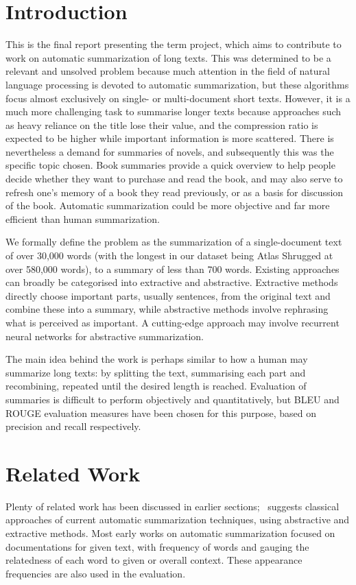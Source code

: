 \section{Introduction}
This is the final report presenting the term project, which aims to contribute to work on automatic summarization of long texts. This was determined to be a relevant and unsolved problem because much attention in the field of natural language processing is devoted to automatic summarization, but these algorithms focus almost exclusively on single- or multi-document short texts. However, it is a much more challenging task to summarise longer texts because approaches such as heavy reliance on the title lose their value, and the compression ratio is expected to be higher while important information is more scattered. There is nevertheless a demand for summaries of novels, and subsequently this was the specific topic chosen. Book summaries provide a quick overview to help people decide whether they want to purchase and read the book, and may also serve to refresh one's memory of a book they read previously, or as a basis for discussion of the book. Automatic summarization could be more objective and far more efficient than human summarization.

We formally define the problem as the summarization of a single-document text of over 30,000 words (with the longest in our dataset being Atlas Shrugged at over 580,000 words), to a summary of less than 700 words. Existing approaches can broadly be categorised into extractive and abstractive. Extractive methods directly choose important parts, usually sentences, from the original text and combine these into a summary, while abstractive methods involve rephrasing what is perceived as important. A cutting-edge approach may involve recurrent neural networks for abstractive summarization.


The main idea behind the work is perhaps similar to how a human may summarize long texts: by splitting the text, summarising each part and recombining, repeated until the desired length is reached. Evaluation of summaries is difficult to perform objectively and quantitatively, but BLEU and ROUGE evaluation measures have been chosen for this purpose, based on precision and recall respectively.

\section{Related Work}
Plenty of related work has been discussed in earlier sections;~\cite{Gaikwad2016} 
suggests classical approaches of current automatic summarization techniques, 
using abstractive and extractive methods. Most early works on 
automatic summarization focused on documentations for given text, with 
frequency of words and gauging the relatedness of each word to given or overall
context. These appearance frequencies are also used in the evaluation.


